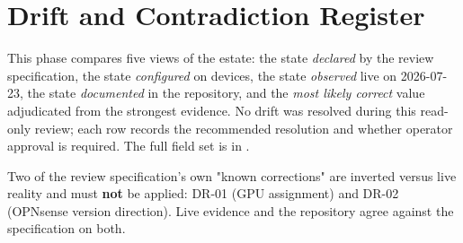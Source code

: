 \section{Drift and Contradiction Register}\label{sec:drift}

This phase compares five views of the estate: the state \emph{declared} by the review specification, the state \emph{configured} on devices, the state \emph{observed} live on 2026-07-23, the state \emph{documented} in the repository, and the \emph{most likely correct} value adjudicated from the strongest evidence. No drift was resolved during this read-only review; each row records the recommended resolution and whether operator approval is required. The full field set is in .

\begin{callout}
Two of the review specification's own "known corrections" are inverted versus live reality and must \textbf{not} be applied: DR-01 (GPU assignment) and DR-02 (OPNsense version direction). Live evidence and the repository agree against the specification on both.
\end{callout}

